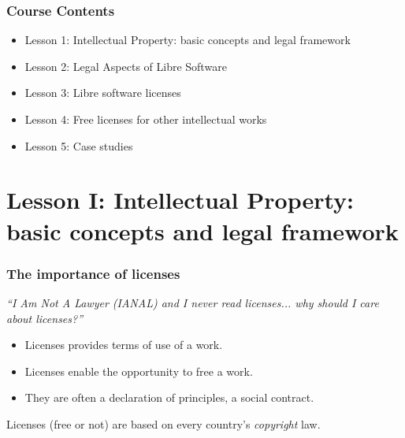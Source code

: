 

\begin{frame}
  \frametitle{Course Contents}

  \begin{itemize}
    \item \alert{Lesson 1: Intellectual Property: basic concepts and legal framework}
    \item Lesson 2: Legal Aspects of Libre Software
    \item Lesson 3: Libre software licenses
    \item Lesson 4: Free licenses for other intellectual works
    \item Lesson 5: Case studies
  \end{itemize}

\end{frame}

\section{Lesson I: Intellectual Property: basic concepts and legal framework}




\begin{frame}
\frametitle{The importance of licenses}
\textit{``\alert{I} \alert{A}m \alert{N}ot \alert{A} \alert{L}awyer (IANAL) and I never read licenses... why should I care about licenses?''}

\pause

\begin{itemize}[<+->]
\item Licenses provides terms of use of a work.
\item Licenses enable the opportunity to free a work.
\item They are often a declaration of principles, a social contract.
\end{itemize}
\bigskip

\pause

\alert{Licenses (free or not) are based on every country's \textit{copyright} law.}

\end{frame}

